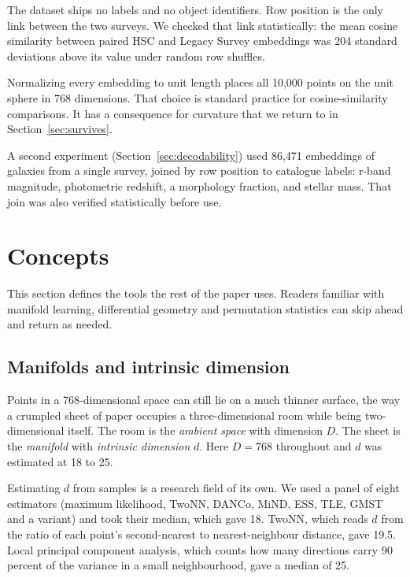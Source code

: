 \documentclass[11pt,a4paper]{article}
\begin{document}
The dataset ships no labels and no object identifiers. Row position is the only link between the two surveys. We checked that link statistically: the mean cosine similarity between paired HSC and Legacy Survey embeddings was 204 standard deviations above its value under random row shuffles.

Normalizing every embedding to unit length places all 10{,}000 points on the unit sphere in 768 dimensions. That choice is standard practice for cosine-similarity comparisons. It has a consequence for curvature that we return to in Section~\ref{sec:survives}.

A second experiment (Section~\ref{sec:decodability}) used 86{,}471 embeddings of galaxies from a single survey, joined by row position to catalogue labels: r-band magnitude, photometric redshift, a morphology fraction, and stellar mass. That join was also verified statistically before use.

\section{Concepts}

This section defines the tools the rest of the paper uses. Readers familiar with manifold learning, differential geometry and permutation statistics can skip ahead and return as needed.

\subsection{Manifolds and intrinsic dimension}

Points in a 768-dimensional space can still lie on a much thinner surface, the way a crumpled sheet of paper occupies a three-dimensional room while being two-dimensional itself. The room is the \emph{ambient space} with dimension $D$. The sheet is the \emph{manifold} with \emph{intrinsic dimension} $d$. Here $D = 768$ throughout and $d$ was estimated at 18 to 25.

Estimating $d$ from samples is a research field of its own. We used a panel of eight estimators (maximum likelihood, TwoNN, DANCo, MiND, ESS, TLE, GMST and a variant) and took their median, which gave 18. TwoNN, which reads $d$ from the ratio of each point's second-nearest to nearest-neighbour distance, gave 19.5. Local principal component analysis, which counts how many directions carry 90 percent of the variance in a small neighbourhood, gave a median of 25.
\end{document}
